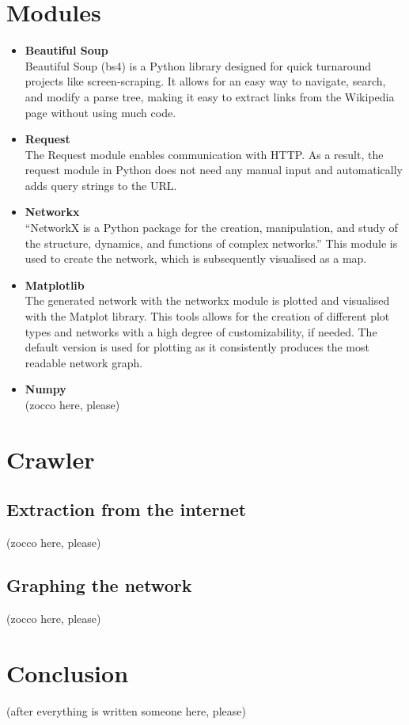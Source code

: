 \documentclass[10pt]{article}
\begin{document}
\section{Modules}

 \begin{itemize}    %
        \item\textbf{Beautiful Soup}\\
	Beautiful Soup (bs4) is a Python library designed for quick turnaround projects like screen-scraping. It allows for an easy way to navigate, search, and modify a parse tree, making it easy to extract links from the Wikipedia page without using much code. 	
	\cite{cru} 
 
        \item \textbf{Request}\\
 	The Request module enables communication with HTTP. As a result, the request module in Python does not need any manual input and automatically adds query strings to the URL.   
	\cite{req}
	
        \item \textbf{Networkx}\\
	``NetworkX is a Python package for the creation, manipulation, and study of the structure, dynamics, and functions of complex networks.'' \cite{net} This module is used to create the network, which is subsequently visualised as a map. 
	
        \item \textbf{Matplotlib}\\
        The generated network with the networkx module is plotted and visualised with the Matplot library. This tools allows for the creation of different plot types and networks with a high degree of customizability, if needed. The default version is used for plotting as it consistently produces the most readable network graph. 
        
        \item \textbf{Numpy}\\
        
        (zocco here, please)
        
        
    \end{itemize}
 

\section{Crawler}
	\subsection{Extraction from the internet}
	
	(zocco here, please)
	
	\subsection{Graphing the network}
	
	(zocco here, please)
	
\section{Conclusion}

(after everything is written someone here, please)



\newpage
 

\end{document}

